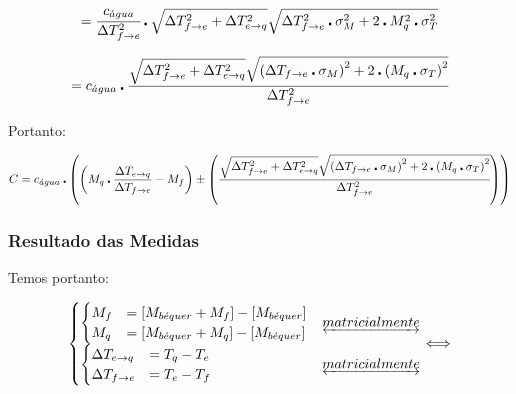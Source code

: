 \documentclass[a4paper]{article}
\begin{document}
			\[
				=\cfrac{c_{\acute{a}gua}}{\Delta T_{f\rightarrow e}^{2}}\centerdot\sqrt{\Delta T_{f\rightarrow e}^{2}+\Delta T_{e\rightarrow q}^{2}}\sqrt{\Delta T_{f\rightarrow e}^{2}\centerdot\sigma_{M}^{2}+2\centerdot M_{q}^{2}\centerdot\sigma_{T}^{2}}
			\]


			\[
				=c_{\acute{a}gua}\centerdot\cfrac{\sqrt{\Delta T_{f\rightarrow e}^{2}+\Delta T_{e\rightarrow q}^{2}}\sqrt{\left(\Delta T_{f\rightarrow e}\centerdot\sigma_{M}\right)^{2}+2\centerdot\left(M_{q}\centerdot\sigma_{T}\right)^{2}}}{\Delta T_{f\rightarrow e}^{2}}
			\]


			Portanto:

			\[
			C=c_{\acute{a}gua}\centerdot\left(\left(M_{q}\centerdot\dfrac{\Delta T_{e\rightarrow q}}{\Delta T_{f\rightarrow e}}-M_{f}\right)\pm\left(\cfrac{\sqrt{\Delta T_{f\rightarrow e}^{2}+\Delta T_{e\rightarrow q}^{2}}\sqrt{\left(\Delta T_{f\rightarrow e}\centerdot\sigma_{M}\right)^{2}+2\centerdot\left(M_{q}\centerdot\sigma_{T}\right)^{2}}}{\Delta T_{f\rightarrow e}^{2}}\right)\right)
			\]

		\subsubsection{Resultado das Medidas}

			Temos portanto:

			\[
			\begin{cases}
				\begin{cases}
					M_{f} & =\left[M_{b\acute{e}quer}+M_{f}\right]-\left[M_{b\acute{e}quer}\right]\\
					M_{q} & =\left[M_{b\acute{e}quer}+M_{q}\right]-\left[M_{b\acute{e}quer}\right]
				\end{cases} & \underleftrightarrow{matricialmente}\\
				\begin{cases}
					\Delta T_{e\rightarrow q} & =T_{q}-T_{e}\\
					\Delta T_{f\rightarrow e} & =T_{e}-T_{f}
				\end{cases} & \underleftrightarrow{matricialmente}
			\end{cases}\Longleftrightarrow
			\]
\end{document}
